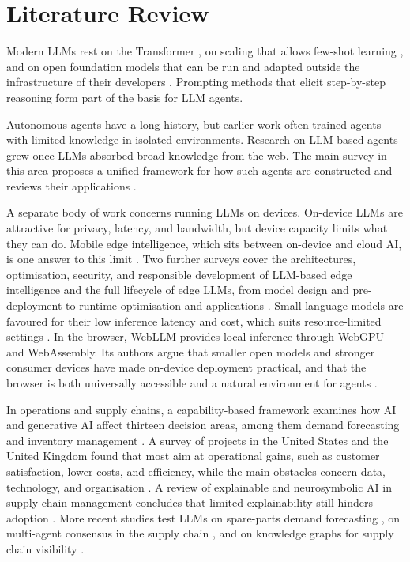 \section{Literature Review}



Modern LLMs rest on the Transformer \parencite{vaswani2017}, on scaling that allows few-shot learning \parencite{brown2020}, and on open foundation models that can be run and adapted outside the infrastructure of their developers \parencite{touvron2023}. Prompting methods that elicit step-by-step reasoning \parencite{wei2022} form part of the basis for LLM agents.

Autonomous agents have a long history, but earlier work often trained agents with limited knowledge in isolated environments. Research on LLM-based agents grew once LLMs absorbed broad knowledge from the web. The main survey in this area proposes a unified framework for how such agents are constructed and reviews their applications \parencite{wang2024agents}.

A separate body of work concerns running LLMs on devices. On-device LLMs are attractive for privacy, latency, and bandwidth, but device capacity limits what they can do. Mobile edge intelligence, which sits between on-device and cloud AI, is one answer to this limit \parencite{qu2025}. Two further surveys cover the architectures, optimisation, security, and responsible development of LLM-based edge intelligence \parencite{friha2024} and the full lifecycle of edge LLMs, from model design and pre-deployment to runtime optimisation and applications \parencite{zheng2025}. Small language models are favoured for their low inference latency and cost, which suits resource-limited settings \parencite{wang2025slm}. In the browser, WebLLM provides local inference through WebGPU and WebAssembly. Its authors argue that smaller open models and stronger consumer devices have made on-device deployment practical, and that the browser is both universally accessible and a natural environment for agents \parencite{ruan2024webllm}.

In operations and supply chains, a capability-based framework examines how AI and generative AI affect thirteen decision areas, among them demand forecasting and inventory management \parencite{jackson2024}. A survey of projects in the United States and the United Kingdom found that most aim at operational gains, such as customer satisfaction, lower costs, and efficiency, while the main obstacles concern data, technology, and organisation \parencite{wamba2023}. A review of explainable and neurosymbolic AI in supply chain management concludes that limited explainability still hinders adoption \parencite{kosasih2023}. More recent studies test LLMs on spare-parts demand forecasting \parencite{nakhost2025}, on multi-agent consensus in the supply chain \parencite{jannelli2025}, and on knowledge graphs for supply chain visibility \parencite{almahri2025}.

